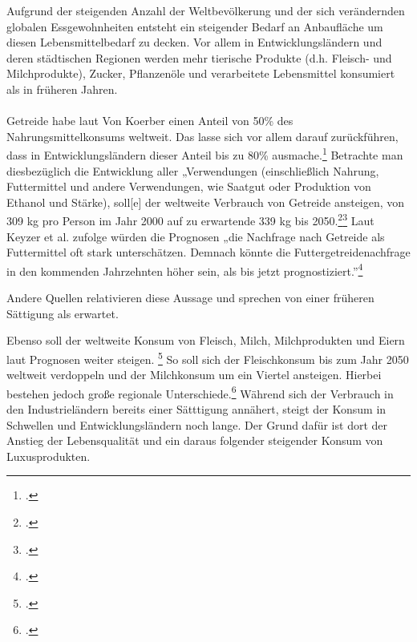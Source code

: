 \documentclass{scrartcl}
\begin{document}
Aufgrund der steigenden Anzahl der Weltbevölkerung und der sich verändernden globalen Essgewohnheiten entsteht ein steigender Bedarf an Anbaufläche um diesen Lebensmittelbedarf zu decken. Vor allem in Entwicklungsländern und deren städtischen Regionen werden mehr tierische Produkte (d.h. Fleisch- und Milchprodukte), Zucker, Pflanzenöle und verarbeitete Lebensmittel konsumiert als in früheren Jahren. \\
\\Getreide habe laut Von Koerber einen Anteil von 50\% des Nahrungsmittelkonsums weltweit. Das lasse sich vor allem darauf zurückführen, dass in Entwicklungsländern dieser Anteil bis zu 80\% ausmache.\footcite[Vgl.][S.4ff]{VonKoerber2008Globale-trends}
Betrachte man diesbezüglich die Entwicklung aller „Verwendungen (einschließlich Nahrung, Futtermittel und andere Verwendungen, wie Saatgut oder Produktion von Ethanol und Stärke), soll[e] der weltweite Verbrauch von Getreide ansteigen, von 309 kg pro Person im Jahr 2000 auf zu erwartende 339 kg bis 2050.\footcite[S.3ff]{VonKoerber2008Globale-trends}\footcite[vgl.][S.23ff]{FAO2006World2030/2050} 
Laut Keyzer et al. zufolge würden die Prognosen „die Nachfrage nach Getreide als Futtermittel oft stark unterschätzen.
Demnach könnte die Futtergetreidenachfrage in den kommenden Jahrzehnten höher sein, als bis jetzt prognostiziert.”\footcite[S.3f]{VonKoerber2008Globale-trends}

Andere Quellen relativieren diese Aussage und sprechen von einer früheren Sättigung als erwartet.

Ebenso soll der weltweite Konsum von Fleisch, Milch, Milchprodukten und Eiern laut Prognosen weiter steigen. \footcite[Vgl.][S.4f]{VonKoerber2008Globale-trends} So soll sich der Fleischkonsum bis zum Jahr 2050 weltweit verdoppeln und der Milchkonsum um ein Viertel ansteigen. Hierbei bestehen jedoch große regionale Unterschiede.\footcite[Vgl.][S.4]{VonKoerber2008Globale-trends} Während sich der Verbrauch in den Industrieländern bereits einer Sätttigung annähert, steigt der Konsum in Schwellen und Entwicklungsländern noch lange. Der Grund dafür ist dort der Anstieg der Lebensqualität und ein daraus folgender steigender Konsum von Luxusprodukten.
\end{document}
